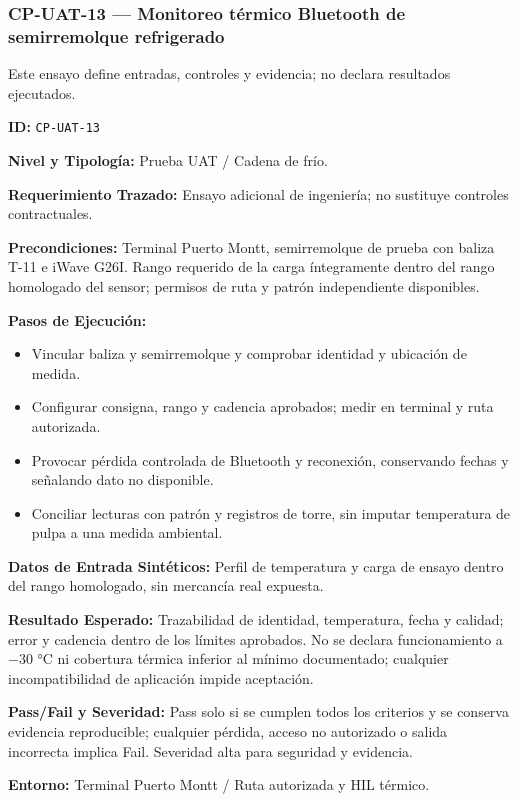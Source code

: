 \subsubsection*{CP-UAT-13 — Monitoreo térmico Bluetooth de semirremolque refrigerado}\label{sec:9-cp-uat-13}

Este ensayo define entradas, controles y evidencia; no declara resultados ejecutados.

\par\noindent\textbf{ID:} \texttt{CP-\allowbreak{}UAT-\allowbreak{}13}\par
\par\noindent\textbf{Nivel y Tipología:} Prueba UAT / Cadena de frío.\par
\par\noindent\textbf{Requerimiento Trazado:} Ensayo adicional de ingeniería; no sustituye controles contractuales.\par
\par\noindent\textbf{Precondiciones:} Terminal Puerto Montt, semirremolque de prueba con baliza T-11 e iWave G26I. Rango requerido de la carga íntegramente dentro del rango homologado del sensor; permisos de ruta y patrón independiente disponibles.\par
\par\noindent\textbf{Pasos de Ejecución:}\par
\begin{itemize}
\item Vincular baliza y semirremolque y comprobar identidad y ubicación de medida.
\item Configurar consigna, rango y cadencia aprobados; medir en terminal y ruta autorizada.
\item Provocar pérdida controlada de Bluetooth y reconexión, conservando fechas y señalando dato no disponible.
\item Conciliar lecturas con patrón y registros de torre, sin imputar temperatura de pulpa a una medida ambiental.
\end{itemize}

\par\noindent\textbf{Datos de Entrada Sintéticos:} Perfil de temperatura y carga de ensayo dentro del rango homologado, sin mercancía real expuesta.\par
\par\noindent\textbf{Resultado Esperado:} Trazabilidad de identidad, temperatura, fecha y calidad; error y cadencia dentro de los límites aprobados. No se declara funcionamiento a −30 °C ni cobertura térmica inferior al mínimo documentado; cualquier incompatibilidad de aplicación impide aceptación.\par
\par\noindent\textbf{Pass/Fail y Severidad:} Pass solo si se cumplen todos los criterios y se conserva evidencia reproducible; cualquier pérdida, acceso no autorizado o salida incorrecta implica Fail. Severidad alta para seguridad y evidencia.\par
\par\noindent\textbf{Entorno:} Terminal Puerto Montt / Ruta autorizada y HIL térmico.\par


